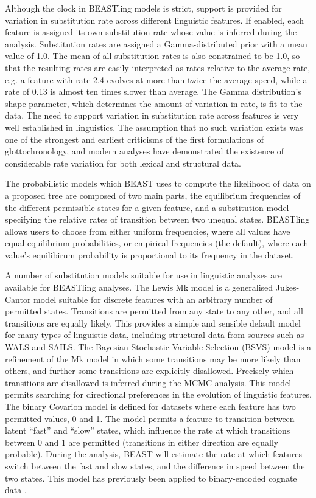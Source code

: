 \documentclass[twocolumn,10pt]{scrartcl}
\begin{document}
Although the clock in BEASTling models is strict, support is provided for variation in substitution rate across different linguistic features.  If enabled, each feature is assigned its own substitution rate whose value is inferred during the analysis.  Substitution rates are assigned a Gamma-distributed prior with a mean value of 1.0.  The mean of all substitution rates is also constrained to be 1.0, so that the resulting rates are easily interpreted as rates relative to the average rate, e.g. a feature with rate 2.4 evolves at more than twice the average speed, while a rate of 0.13 is almost ten times slower than average.  The Gamma distribution's shape parameter, which determines the amount of variation in rate, is fit to the data.  The need to support variation in substitution rate across features is very well established in linguistics.  The assumption that no such variation exists was one of the strongest and earliest criticisms of the first formulations of glottochronology, and modern analyses have demonstrated the existence of considerable rate variation for both lexical\cite{Pagel2007} and structural\cite{Greenhill2010,Dediu2011} data.

The probabilistic models which BEAST uses to compute the likelihood of data on a proposed tree are composed of two main parts, the equilibrium frequencies of the different permissible states for a given feature, and a substitution model specifying the relative rates of transition between two unequal states.  BEASTling allows users to choose from either uniform frequencies, where all values have equal equilibrium probabilities, or empirical frequencies (the default), where each value's equilibirum probability is proportional to its frequency in the dataset.

A number of substitution models suitable for use in linguistic analyses are available for BEASTling analyses.  The Lewis Mk model\cite{Lewis2001} is a generalised Jukes-Cantor model suitable for discrete features with an arbitrary number of permitted states.  Transitions are permitted from any state to any other, and all transitions are equally likely.  This provides a simple and sensible default model for many types of linguistic data, including structural data from sources such as WALS\cite{Dryer2013} and SAILS\cite{Muysken2014}.  The Bayesian Stochastic Variable Selection (BSVS) model is a refinement of the Mk model in which some transitions may be more likely than others, and further some transitions are explicitly disallowed.  Precisely which transitions are disallowed is inferred during the MCMC analysis.  This model permits searching for directional preferences in the evolution of linguistic features.  The binary Covarion model\cite{Penny2001} is defined for datasets where each feature has two permitted values, 0 and 1.  The model permits a feature to transition between latent ``fast'' and ``slow'' states, which influence the rate at which transitions between 0 and 1 are permitted (transitions in either direction are equally probable).  During the analysis, BEAST will estimate the rate at which features switch between the fast and slow states, and the difference in speed between the two states.  This model has previously been applied to binary-encoded cognate data \cite{Gray2009,Bouckaert2012}.
\end{document}
